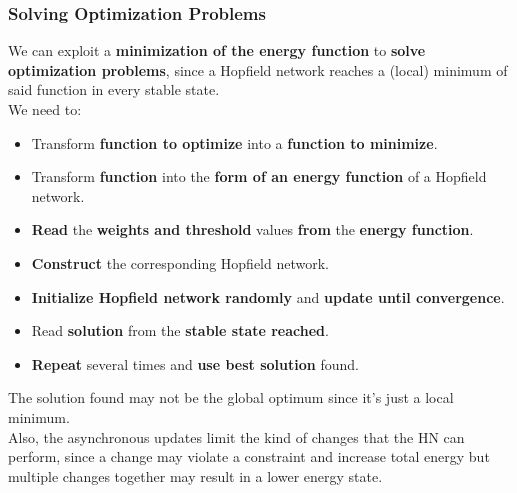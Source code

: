 \newpage

\subsubsection{Solving Optimization Problems}
We can exploit a \textbf{minimization of the energy function} to \textbf{solve optimization problems}, since a Hopfield network reaches a (local) minimum of said function in every stable state.\\

We need to:
\begin{itemize}
	\item Transform \textbf{function to optimize} into a \textbf{function to minimize}.\\
	
	\item Transform \textbf{function} into the \textbf{form of an energy function} of a Hopfield network.\\
	
	\item \textbf{Read} the \textbf{weights and threshold} values \textbf{from} the \textbf{energy function}.\\
	
	\item \textbf{Construct} the corresponding Hopfield network.\\
	
	\item \textbf{Initialize Hopfield network randomly} and \textbf{update until convergence}.\\
	
	\item Read \textbf{solution} from the \textbf{stable state reached}.\\
	
	\item \textbf{Repeat} several times and \textbf{use best solution} found.\\
	
\end{itemize}

The solution found may not be the global optimum since it's just a local minimum.\\

Also, the asynchronous updates limit the kind of changes that the HN can perform, since a change may violate a constraint and increase total energy but multiple changes together may result in a lower energy state.\\

